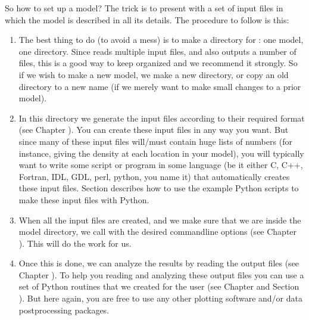 \documentclass[letterpaper,10pt,english]{sphinxmanual}
\begin{document}
So how to set up a model? The trick is to present  with a set of
input files in which the model is described in all its details. The procedure to
follow is this:
\begin{enumerate}
%
\item {} 
The best thing to do (to avoid a mess) is to make a directory for
: one model, one directory. Since  reads
multiple input files, and also outputs a number of files, this is a good
way to keep organized and we recommend it strongly.  So if we wish to make
a new model, we make a new directory, or copy an old directory to a new
name (if we merely want to make small changes to a prior model).

\item {} 
In this directory we generate the input files according to their required
format (see Chapter {\hyperref[\detokenize{inputoutputfiles:chap-input-files}]{}}). You can create these input files
in any way you want. But since many of these input files will/must contain
huge lists of numbers (for instance, giving the density at each location in
your model), you will typically want to write some script or program in some
language (be it either C, C++, Fortran, IDL, GDL, perl, python, you name it)
that automatically creates these input files.   Section
{\hyperref[\detokenize{basicstructure:sec-example-models}]{}} describes how to use the example Python scripts to
make these input files with Python.

\item {} 
When all the input files are created, and we make sure that we are inside the
model directory, we call  with the desired command\sphinxhyphen{}line options
(see Chapter {\hyperref[\detokenize{clioptions:chap-command-line-options}]{}}). This will do the work for us.

\item {} 
Once this is done, we can analyze the results by reading the output files
(see Chapter {\hyperref[\detokenize{inputoutputfiles:chap-input-files}]{}}). To help you reading and analyzing
these output files you can use a set of Python routines that we created for
the user (see Chapter {\hyperref[\detokenize{pythontools:chap-python-analysis-tools}]{}} and Section
{\hyperref[\detokenize{installation:sec-install-pythonscripts}]{}}). But here again, you are free to use any
other plotting software and/or data postprocessing packages.

\end{enumerate}
\end{document}
